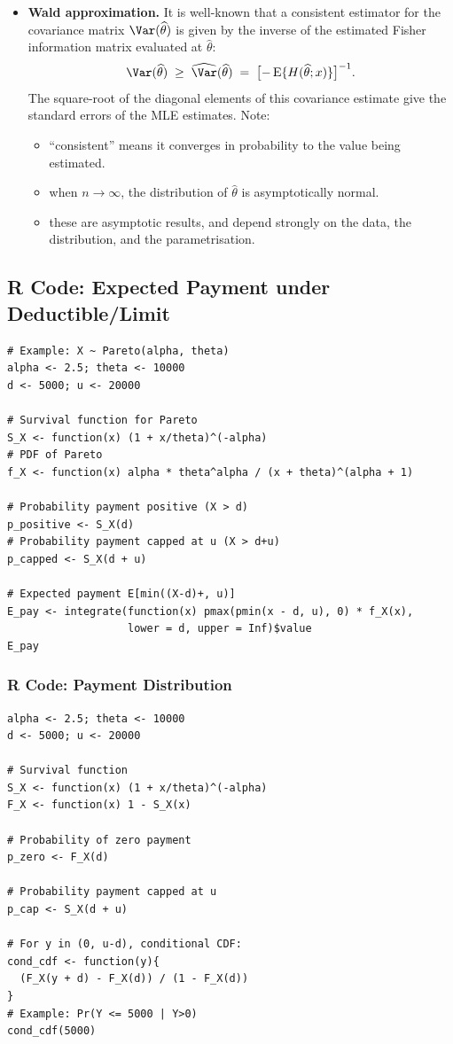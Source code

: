 \documentclass{article}
\begin{document}
\begin{itemize}
  \item \textbf{Wald approximation.} It is well-known that a consistent estimator
    for the covariance matrix $\Var(\widehat\theta)$ is given by the inverse of
    the estimated Fisher information matrix evaluated at $\widehat\theta$:
    \begin{equation*}
      \Var(\widehat\theta)\;\ge\;
      \widehat{\Var}(\widehat\theta)
      \;=\;
      \bigl[-\,\mathrm{E}\{H(\widehat\theta; x)\}\bigr]^{-1}.
    \end{equation*}
    The square-root of the diagonal elements of this covariance estimate give
    the standard errors of the MLE estimates.  Note:
    \begin{itemize}
      \item “consistent” means it converges in probability to the value being estimated.
      \item when $n \to \infty$, the distribution of $\widehat\theta$ is asymptotically normal.
      \item these are asymptotic results, and depend strongly on the data,
        the distribution, and the parametrisation.
    \end{itemize}

\end{itemize}


\subsection{R Code: Expected Payment under Deductible/Limit}
\begin{lstlisting}
# Example: X ~ Pareto(alpha, theta)
alpha <- 2.5; theta <- 10000
d <- 5000; u <- 20000

# Survival function for Pareto
S_X <- function(x) (1 + x/theta)^(-alpha)
# PDF of Pareto
f_X <- function(x) alpha * theta^alpha / (x + theta)^(alpha + 1)

# Probability payment positive (X > d)
p_positive <- S_X(d)
# Probability payment capped at u (X > d+u)
p_capped <- S_X(d + u)

# Expected payment E[min((X-d)+, u)]
E_pay <- integrate(function(x) pmax(pmin(x - d, u), 0) * f_X(x),
                   lower = d, upper = Inf)$value
E_pay
\end{lstlisting}


\subsubsection*{R Code: Payment Distribution}
\begin{lstlisting}
alpha <- 2.5; theta <- 10000
d <- 5000; u <- 20000

# Survival function
S_X <- function(x) (1 + x/theta)^(-alpha)
F_X <- function(x) 1 - S_X(x)

# Probability of zero payment
p_zero <- F_X(d)

# Probability payment capped at u
p_cap <- S_X(d + u)

# For y in (0, u-d), conditional CDF:
cond_cdf <- function(y){
  (F_X(y + d) - F_X(d)) / (1 - F_X(d))
}
# Example: Pr(Y <= 5000 | Y>0) 
cond_cdf(5000)
\end{lstlisting}
\end{document}
